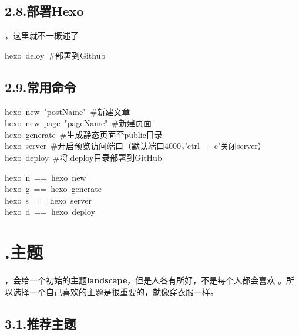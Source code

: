 \documentclass{article}
\begin{document}
\subsection{2.8.\hspace*{0.5em}部署Hexo}\label{sec-hexo}%

，这里就不一概述了%
\begin{mdpre}%
\noindent hexo~deloy~\#部署到Github\\
\end{mdpre}
\subsection{2.9.\hspace*{0.5em}常用命令}\label{section}%
\begin{mdpre}%
\noindent hexo~new~"postName"~\#新建文章\\
hexo~new~page~"pageName"~\#新建页面\\
hexo~generate~\#生成静态页面至public目录\\
hexo~server~\#开启预览访问端口（默认端口4000，'ctrl~+~c'关闭server）\\
hexo~deploy~\#将.deploy目录部署到GitHub\\
\end{mdpre}
\begin{mdpre}%
\noindent hexo~n~==~hexo~new\\
hexo~g~==~hexo~generate\\
hexo~s~==~hexo~server\\
hexo~d~==~hexo~deploy\\
\end{mdpre}
\section{.\hspace*{0.5em}主题}\label{section}%

，会给一个初始的主题\textbf{landscape}，但是人各有所好，不是每个人都会喜欢
。所以选择一个自己喜欢的主题是很重要的，就像穿衣服一样。%

\subsection{3.1.\hspace*{0.5em}推荐主题}\label{section}%
\end{document}
